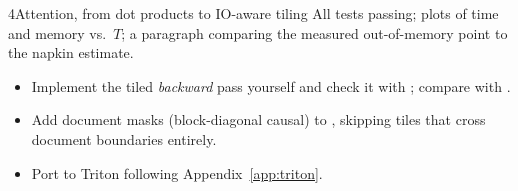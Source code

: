 \begin{labbox}{4}{Attention, from dot products to IO-aware tiling}
All tests passing; plots of time and memory vs.\ $T$; a paragraph comparing the measured
out-of-memory point to the napkin estimate.

\begin{itemize}
  \item Implement the tiled \emph{backward} pass yourself and check it with
  ; compare with .
  \item Add document masks (block-diagonal causal) to , skipping tiles that
  cross document boundaries entirely.
  \item Port  to Triton following Appendix~\ref{app:triton}.
\end{itemize}
\end{labbox}
